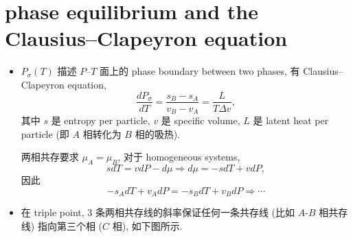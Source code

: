 \section{phase equilibrium and the Clausius--Clapeyron equation}
\begin{itemize}
	\item $P_\sigma(T)$ 描述 $P$--$T$ 面上的 phase boundary between two phases, 有 Clausius--Clapeyron equation,
	\begin{equation}
		\frac{dP_\sigma}{dT} = \frac{s_B - s_A}{v_B - v_A} = \frac{L}{T \Delta v},
	\end{equation}
	其中 $s$ 是 entropy per particle, $v$ 是 specific volume, $L$ 是 latent heat per particle (即 $A$ 相转化为 $B$ 相的吸热).
	
	\begin{tcolorbox}[title=proof:]
		两相共存要求 $\mu_A = \mu_B$, 对于 homogeneous systems,
		\begin{equation}
			s dT = v dP - d\mu \Longrightarrow d\mu = - s dT + v dP,
		\end{equation}
		因此
		\begin{equation}
			- s_A dT + v_A dP = - s_B dT + v_B dP \Longrightarrow \cdots
		\end{equation}
	\end{tcolorbox}
	
	\item 在 triple point, 3 条两相共存线的斜率保证任何一条共存线 (比如 $A$-$B$ 相共存线) 指向第三个相 ($C$ 相), 如下图所示.
	

\end{itemize}
